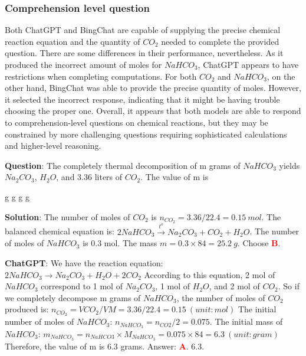 \documentclass{article}
\begin{document}
{\begin{mdframed}[linewidth=1pt,linecolor=red]
	\end{mdframed}	
	
	\subsubsection{Comprehension level question}
	\label{VNHSGE_Che_C}
	
	Both ChatGPT and BingChat are capable of supplying the precise chemical reaction equation and the quantity of $CO_2$ needed to complete the provided question. There are some differences in their performance, nevertheless. As it produced the incorrect amount of moles for $NaHCO_3$, ChatGPT appears to have restrictions when completing computations. For both $CO_2$ and $NaHCO_3$, on the other hand, BingChat was able to provide the precise quantity of moles. However, it selected the incorrect response, indicating that it might be having trouble choosing the proper one. Overall, it appears that both models are able to respond to comprehension-level questions on chemical reactions, but they may be constrained by more challenging questions requiring sophisticated calculations and higher-level reasoning.
	
	
	
	\begin{mdframed}[linewidth=1pt,linecolor=red] \textbf{Question}: The completely thermal decomposition of m grams of $NaHCO_3$ yields $Na_2CO_3$, $H_2O$, and 3.36 liters of $CO_2$. The value of m is
		
		\begin{oneparchoices}
			 g
			 g
			 g
			 g
		\end{oneparchoices}
		
		\textbf{Solution}: The number of moles of $CO_2$ is $n_{CO_2} = 3.36/22.4 = 0.15~mol$. The balanced chemical equation is: $2NaHCO_3  \overset{t^o}{\rightarrow} Na_2CO_3 + CO_2 + H_2O$.	The number of moles of $NaHCO_3$ is 0.3 mol. The mass $m = 0.3 \times 84 = 25.2~g$. Choose \textcolor{red}{\textbf{B}}.
		
		\textbf{ChatGPT}: We have the reaction equation:
		$2NaHCO_3 \rightarrow Na_2CO_3 + H_2O + 2CO_2$
		According to this equation, 2 mol of $NaHCO_3$ correspond to 1 mol of $Na_2CO_3$, 1 mol of $H_2O$, and 2 mol of $CO_2$. So if we completely decompose m grams of $NaHCO_3$, the number of moles of $CO_2$ produced is:
		$n_{CO_2} = VCO_2/VM = 3.36/22.4 = 0.15~(unit: mol)$
		The initial number of moles of $NaHCO_3$: $n_{NaHCO_3} = n_{CO2}/2 = 0.075$. The initial mass of $NaHCO_3$:
		$m_{NaHCO_3} = n_{NaHCO3} \times M_{NaHCO_3} = 0.075 \times 84 = 6.3~(unit: gram)$
		Therefore, the value of m is 6.3 grams.
		Answer: \textcolor{red}{\textbf{A}}. 6.3.
		

\end{mdframed}}
\end{document}
